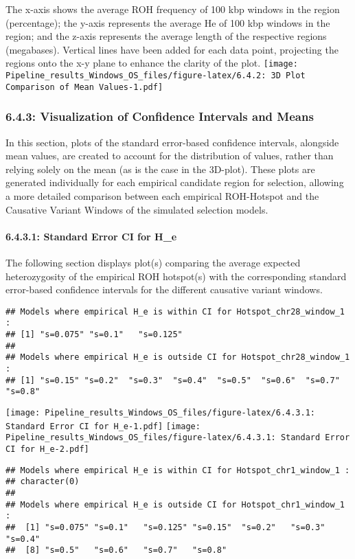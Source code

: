 \documentclass[
]{article}
\begin{document}
The x-axis shows the average ROH frequency of 100 kbp windows in the
region (percentage); the y-axis represents the average He of 100 kbp
windows in the region; and the z-axis represents the average length of
the respective regions (megabases). Vertical lines have been added for
each data point, projecting the regions onto the x-y plane to enhance
the clarity of the plot.
\texttt{[image: Pipeline\_results\_Windows\_OS\_files/figure-latex/6.4.2: 3D Plot Comparison of Mean Values-1.pdf]}

\subsubsection{6.4.3: Visualization of Confidence Intervals and
Means}\label{visualization-of-confidence-intervals-and-means}

In this section, plots of the standard error-based confidence intervals,
alongside mean values, are created to account for the distribution of
values, rather than relying solely on the mean (as is the case in the
3D-plot). These plots are generated individually for each empirical
candidate region for selection, allowing a more detailed comparison
between each empirical ROH-Hotspot and the Causative Variant Windows of
the simulated selection models.

\paragraph{6.4.3.1: Standard Error CI for
H\_e}\label{standard-error-ci-for-h_e}

The following section displays plot(s) comparing the average expected
heterozygosity of the empirical ROH hotspot(s) with the corresponding
standard error-based confidence intervals for the different causative
variant windows.

\begin{verbatim}
## Models where empirical H_e is within CI for Hotspot_chr28_window_1 :
## [1] "s=0.075" "s=0.1"   "s=0.125"
## 
## Models where empirical H_e is outside CI for Hotspot_chr28_window_1 :
## [1] "s=0.15" "s=0.2"  "s=0.3"  "s=0.4"  "s=0.5"  "s=0.6"  "s=0.7"  "s=0.8"
\end{verbatim}

\texttt{[image: Pipeline\_results\_Windows\_OS\_files/figure-latex/6.4.3.1: Standard Error CI for H\_e-1.pdf]}
\texttt{[image: Pipeline\_results\_Windows\_OS\_files/figure-latex/6.4.3.1: Standard Error CI for H\_e-2.pdf]}

\begin{verbatim}
## Models where empirical H_e is within CI for Hotspot_chr1_window_1 :
## character(0)
## 
## Models where empirical H_e is outside CI for Hotspot_chr1_window_1 :
##  [1] "s=0.075" "s=0.1"   "s=0.125" "s=0.15"  "s=0.2"   "s=0.3"   "s=0.4"  
##  [8] "s=0.5"   "s=0.6"   "s=0.7"   "s=0.8"
\end{verbatim}
\end{document}
